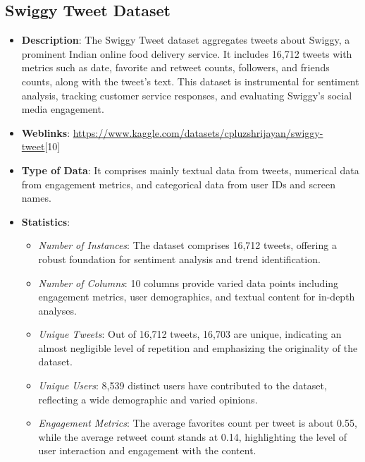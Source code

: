 \documentclass[conference]{IEEEtran}
\begin{document}
\subsection{Swiggy Tweet Dataset}
\begin{itemize}
    \item \textbf{Description}: The Swiggy Tweet dataset aggregates tweets about Swiggy, a prominent Indian online food delivery service. It includes 16,712 tweets with metrics such as date, favorite and retweet counts, followers, and friends counts, along with the tweet's text. This dataset is instrumental for sentiment analysis, tracking customer service responses, and evaluating Swiggy's social media engagement.
    
    \item \textbf{Weblinks}: \url{https://www.kaggle.com/datasets/cpluzshrijayan/swiggy-tweet}[10]
    
    \item \textbf{Type of Data}: It comprises mainly textual data from tweets, numerical data from engagement metrics, and categorical data from user IDs and screen names.
    
    \item \textbf{Statistics}:
    \begin{itemize}
        \item \textit{Number of Instances}: The dataset comprises 16,712 tweets, offering a robust foundation for sentiment analysis and trend identification.
        \item \textit{Number of Columns}: 10 columns provide varied data points including engagement metrics, user demographics, and textual content for in-depth analyses.
        \item \textit{Unique Tweets}: Out of 16,712 tweets, 16,703 are unique, indicating an almost negligible level of repetition and emphasizing the originality of the dataset.
        \item \textit{Unique Users}: 8,539 distinct users have contributed to the dataset, reflecting a wide demographic and varied opinions.
        \item \textit{Engagement Metrics}: The average favorites count per tweet is about 0.55, while the average retweet count stands at 0.14, highlighting the level of user interaction and engagement with the content.
    \end{itemize}
\end{itemize}
\end{document}
